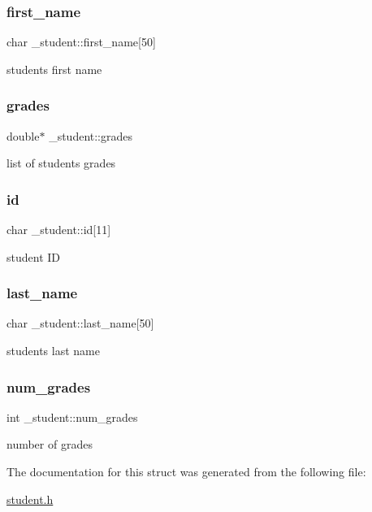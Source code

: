 \subsubsection{\texorpdfstring{first\+\_\+name}{first\_name}}
{\footnotesize\ttfamily char \+\_\+student\+::first\+\_\+name\mbox{[}50\mbox{]}}

students first name \mbox{\label{struct__student_ad0f75a9ff0f6104eb9e3bb3c4f7ad97b}} 
\subsubsection{\texorpdfstring{grades}{grades}}
{\footnotesize\ttfamily double$\ast$ \+\_\+student\+::grades}

list of student\textquotesingle{}s grades \mbox{\label{struct__student_adaee78078859cdecdbe9128dd655b748}} 
\subsubsection{\texorpdfstring{id}{id}}
{\footnotesize\ttfamily char \+\_\+student\+::id\mbox{[}11\mbox{]}}

student ID \mbox{\label{struct__student_a18eb2a90671a2292c017b8f4fbde7eec}} 
\subsubsection{\texorpdfstring{last\+\_\+name}{last\_name}}
{\footnotesize\ttfamily char \+\_\+student\+::last\+\_\+name\mbox{[}50\mbox{]}}

students last name \mbox{\label{struct__student_a6592ee968ed2226737f45243e7602636}} 
\subsubsection{\texorpdfstring{num\+\_\+grades}{num\_grades}}
{\footnotesize\ttfamily int \+\_\+student\+::num\+\_\+grades}

number of grades 

The documentation for this struct was generated from the following file\+:\begin{DoxyCompactItemize}
\item 
\mbox{\hyperlink{student_8h}{student.\+h}}\end{DoxyCompactItemize}
